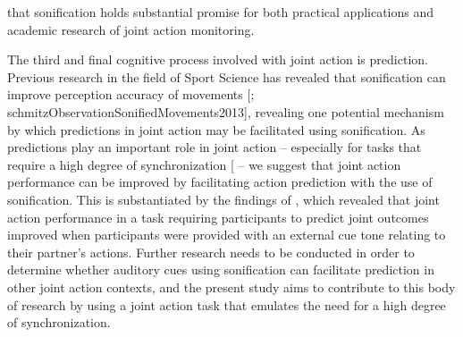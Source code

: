 \documentclass[10pt,a4paper,onecolumn]{article}
\begin{document}
that sonification holds substantial promise for both practical applications and academic research of joint action monitoring.

The third and final cognitive process involved with joint action is prediction. Previous research in the field of Sport Science has revealed that sonification can improve perception accuracy of movements {[}\textcite{effenbergMovementSonificationEffects2005}; schmitzObservationSonifiedMovements2013{]}, revealing one potential mechanism by which predictions in joint action may be facilitated using sonification. As predictions play an important role in joint action \autocite{sebanzJointActionBodies2006} -- especially for tasks that require a high degree of synchronization {[}\textcite{vesperMinimalArchitectureJoint2010} -- we suggest that joint action performance can be improved by facilitating action prediction with the use of sonification. This is substantiated by the findings of \textcite{knoblichActionCoordinationGroups2003}, which revealed that joint action performance in a task requiring participants to predict joint outcomes improved when participants were provided with an external cue tone relating to their partner's actions. Further research needs to be conducted in order to determine whether auditory cues using sonification can facilitate prediction in other joint action contexts, and the present study aims to contribute to this body of research by using a joint action task that emulates the need for a high degree of synchronization.
\end{document}

